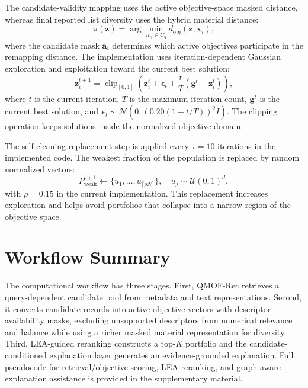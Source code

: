 \documentclass[12pt,a4paper]{article}
\begin{document}
The candidate-validity mapping uses the active objective-space masked distance, whereas final reported list diversity uses the hybrid material distance:
\begin{equation}
  \pi(\mathbf{z}) = \arg\min_{m_i \in C_q}d_{\mathrm{obj}}(\mathbf{z},\mathbf{x}_i),
\end{equation}
where the candidate mask $\mathbf{a}_i$ determines which active objectives participate in the remapping distance. The implementation uses iteration-dependent Gaussian exploration and exploitation toward the current best solution:
\begin{equation}
  \mathbf{z}_i^{t+1} =
  \operatorname{clip}_{[0,1]}\!\left(\mathbf{z}_i^t
  + \boldsymbol{\epsilon}_t
  + \frac{t}{T}(\mathbf{g}^t-\mathbf{z}_i^t)\right),
\end{equation}
where $t$ is the current iteration, $T$ is the maximum iteration count, $\mathbf{g}^t$ is the current best solution, and $\boldsymbol{\epsilon}_t \sim \mathcal{N}(0,(0.20(1-t/T))^2I)$. The clipping operation keeps solutions inside the normalized objective domain.

The self-cleaning replacement step is applied every $\tau = 10$ iterations in the implemented code. The weakest fraction of the population is replaced by random normalized vectors:
\begin{equation}
  P^{t+1}_{\mathrm{weak}} \leftarrow \{u_1,\ldots,u_{\lceil\rho N\rceil}\},\quad u_j \sim \mathcal{U}(0,1)^d,
\end{equation}
with $\rho = 0.15$ in the current implementation. This replacement increases exploration and helps avoid portfolios that collapse into a narrow region of the objective space.

\section{Workflow Summary}
\label{sec:algorithms}

The computational workflow has three stages. First, QMOF-Rec retrieves a query-dependent candidate pool from metadata and text representations. Second, it converts candidate records into active objective vectors with descriptor-availability masks, excluding unsupported descriptors from numerical relevance and balance while using a richer masked material representation for diversity. Third, LEA-guided reranking constructs a top-$K$ portfolio and the candidate-conditioned explanation layer generates an evidence-grounded explanation. Full pseudocode for retrieval/objective scoring, LEA reranking, and graph-aware explanation assistance is provided in the supplementary material.
\end{document}
